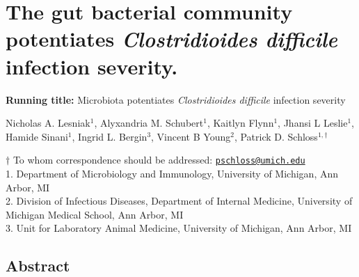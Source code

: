 \documentclass[
  12pt,
]{article}
\author{}
\date{\vspace{-2.5em}}
\begin{document}
\linenumbers
\doublespacing

\hypertarget{the-gut-bacterial-community-potentiates-clostridioides-difficile-infection-severity.}{%
\section{\texorpdfstring{The gut bacterial community potentiates
\emph{Clostridioides difficile} infection
severity.}{The gut bacterial community potentiates Clostridioides difficile infection severity.}}\label{the-gut-bacterial-community-potentiates-clostridioides-difficile-infection-severity.}}

\vspace{30mm}

\textbf{Running title:} Microbiota potentiates \emph{Clostridioides
difficile} infection severity

\vspace{20mm}

Nicholas A. Lesniak\(^1\), Alyxandria M. Schubert\(^1\), Kaitlyn
Flynn\(^1\), Jhansi L Leslie\(^1\), Hamide Sinani\(^1\), Ingrid L.
Bergin\(^3\), Vincent B Young\(^2\), Patrick D. Schloss\(^{1,\dagger}\)

\vspace{30mm}

\(\dagger\) To whom correspondence should be addressed:
\href{mailto:pschloss@umich.edu}{\nolinkurl{pschloss@umich.edu}}\\
1. Department of Microbiology and Immunology, University of Michigan,
Ann Arbor, MI\\
2. Division of Infectious Diseases, Department of Internal Medicine,
University of Michigan Medical School, Ann Arbor, MI\\
3. Unit for Laboratory Animal Medicine, University of Michigan, Ann
Arbor, MI

\newpage

\hypertarget{abstract}{%
\subsection{Abstract}\label{abstract}}
\end{document}
